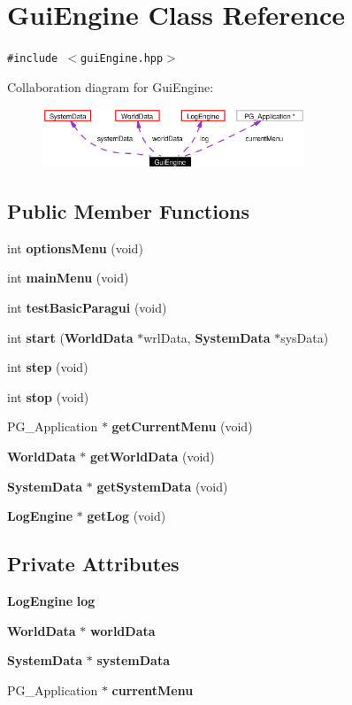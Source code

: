 \section{Gui\-Engine Class Reference}
\label{classGuiEngine}
{\tt \#include $<$gui\-Engine.hpp$>$}

Collaboration diagram for Gui\-Engine:\begin{figure}[H]
\begin{center}
\leavevmode
\includegraphics[width=223pt]{classGuiEngine__coll__graph}
\end{center}
\end{figure}
\subsection*{Public Member Functions}
\begin{CompactItemize}
\item 
int {\bf options\-Menu} (void)
\item 
int {\bf main\-Menu} (void)
\item 
int {\bf test\-Basic\-Paragui} (void)
\item 
int {\bf start} ({\bf World\-Data} $\ast$wrl\-Data, {\bf System\-Data} $\ast$sys\-Data)
\item 
int {\bf step} (void)
\item 
int {\bf stop} (void)
\item 
PG\_\-Application $\ast$ {\bf get\-Current\-Menu} (void)
\item 
{\bf World\-Data} $\ast$ {\bf get\-World\-Data} (void)
\item 
{\bf System\-Data} $\ast$ {\bf get\-System\-Data} (void)
\item 
{\bf Log\-Engine} $\ast$ {\bf get\-Log} (void)
\end{CompactItemize}
\subsection*{Private Attributes}
\begin{CompactItemize}
\item 
{\bf Log\-Engine} {\bf log}
\item 
{\bf World\-Data} $\ast$ {\bf world\-Data}
\item 
{\bf System\-Data} $\ast$ {\bf system\-Data}
\item 
PG\_\-Application $\ast$ {\bf current\-Menu}
\end{CompactItemize}


